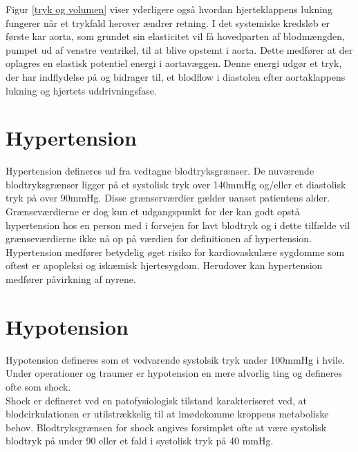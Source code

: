 Figur \ref{tryk og volumen} viser yderligere også hvordan hjerteklappens lukning fungerer når et trykfald herover ændrer retning. I det systemiske kredsløb er første kar aorta, som grundet sin elasticitet vil få hovedparten af blodmængden, pumpet ud af venstre ventrikel, til at blive opstemt i aorta. Dette medfører at der oplagres en elastisk potentiel energi i aortavæggen. Denne energi udgør et tryk, der har indflydelse på og bidrager til, et blodflow i diastolen efter aortaklappens lukning og hjertets uddrivningsfase. 

\section{Hypertension}
Hypertension defineres ud fra vedtagne blodtryksgrænser. De nuværende blodtryksgrænser ligger på et systolisk tryk over 140mmHg og/eller et diastolisk tryk på over 90mmHg. Disse grænserværdier gælder uanset patientens alder. Grænseværdierne er dog kun et udgangspunkt for der kan godt opstå hypertension hos en person med i forvejen for lavt blodtryk og i dette tilfælde vil grænseværdierne ikke nå op på værdien for definitionen af hypertension.\\
Hypertension medfører betydelig øget risiko for kardiovaskulære sygdomme som oftest er apopleksi og iskæmisk hjertesygdom. Herudover kan hypertension medfører påvirkning af nyrene.\cite{Hypertension}

\section{Hypotension}
Hypotension defineres som et vedvarende systolsik tryk under 100mmHg i hvile. \\
Under operationer og traumer er hypotension en mere alvorlig ting og defineres ofte som shock.\\
Shock er defineret ved en patofysiologisk tilstand karakteriseret ved, at blodcirkulationen er utilstrækkelig til at imødekomme kroppens metaboliske behov. Blodtryksgrænsen for shock angives forsimplet ofte at være systolisk blodtryk på under 90 eller et fald i systolisk tryk på 40 mmHg.
\cite{Hypotension}

